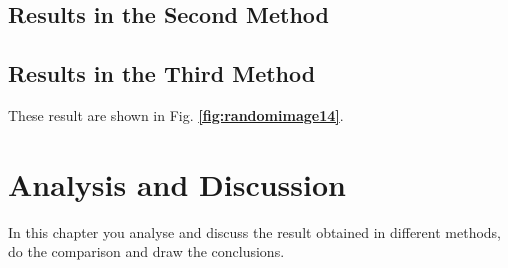 \documentclass[12pt]{report}
\begin{document}
\section{Results in the Second Method}
\lipsum[16]
\section{Results in the Third Method}
These result are shown in Fig. \textbf{\ref{fig:randomimage14}}.
\\[5mm]
\lipsum[17]

\chapter{Analysis and Discussion}

In this chapter you analyse and discuss the result obtained in different methods, do the comparison and draw the conclusions.
\end{document}
